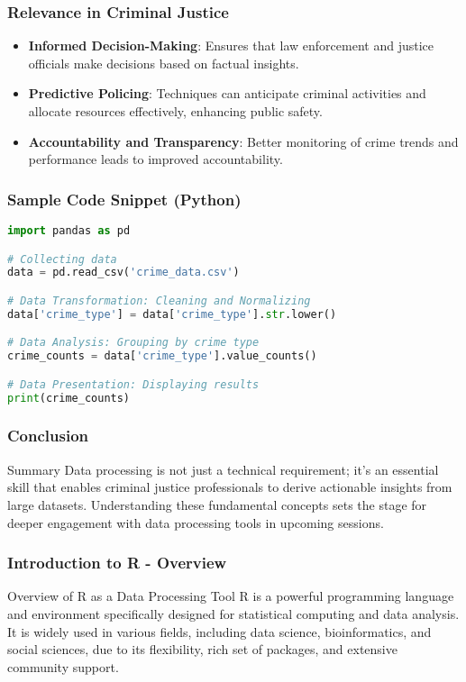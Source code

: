 \documentclass[aspectratio=169]{beamer}
\begin{document}
\begin{frame}
    \frametitle{Relevance in Criminal Justice}
    \begin{itemize}
        \item \textbf{Informed Decision-Making}: Ensures that law enforcement and justice officials make decisions based on factual insights.
        \item \textbf{Predictive Policing}: Techniques can anticipate criminal activities and allocate resources effectively, enhancing public safety.
        \item \textbf{Accountability and Transparency}: Better monitoring of crime trends and performance leads to improved accountability.
    \end{itemize}
\end{frame}

\begin{frame}[fragile]
    \frametitle{Sample Code Snippet (Python)}
    \begin{lstlisting}[language=Python]
import pandas as pd

# Collecting data
data = pd.read_csv('crime_data.csv')

# Data Transformation: Cleaning and Normalizing
data['crime_type'] = data['crime_type'].str.lower()

# Data Analysis: Grouping by crime type
crime_counts = data['crime_type'].value_counts()

# Data Presentation: Displaying results
print(crime_counts)
    \end{lstlisting}
\end{frame}

\begin{frame}
    \frametitle{Conclusion}
    \begin{block}{Summary}
        Data processing is not just a technical requirement; it's an essential skill that enables criminal justice professionals to derive actionable insights from large datasets. Understanding these fundamental concepts sets the stage for deeper engagement with data processing tools in upcoming sessions.
    \end{block}
\end{frame}

\begin{frame}[fragile]
    \frametitle{Introduction to R - Overview}
    \begin{block}{Overview of R as a Data Processing Tool}
        R is a powerful programming language and environment specifically designed for statistical computing and data analysis. It is widely used in various fields, including data science, bioinformatics, and social sciences, due to its flexibility, rich set of packages, and extensive community support.
    \end{block}
\end{frame}
\end{document}

